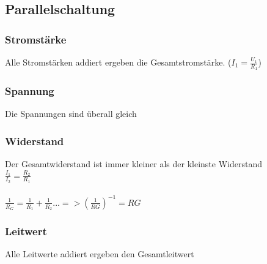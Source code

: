 \documentclass[../../main.tex]{subfiles}
\begin{document}
\subsection{Parallelschaltung}
\subsubsection{Stromstärke}
Alle Stromstärken addiert ergeben die Gesamtstromstärke.
($I_1 = \frac{U_1}{R_1}$)
\subsubsection{Spannung}
Die Spannungen sind überall gleich
\subsubsection{Widerstand}
Der Gesamtwiderstand ist immer kleiner als der kleinste Widerstand \\
$\frac{I_1}{I_2} = \frac{R_2}{R_1}$ \\
\\
$\frac{1}{R_G} = \frac{1}{R_1} + \frac{1}{R_2} ... => (\frac{1}{RG})^{-1} = RG$ \\
\subsubsection{Leitwert}
Alle Leitwerte addiert ergeben den Gesamtleitwert
\end{document}
